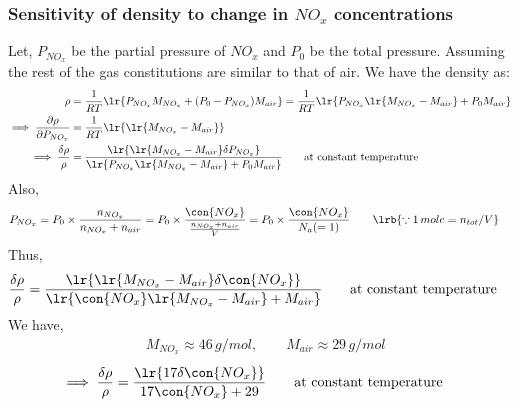 \subsubsection{Sensitivity of density to change in $NO_x$ concentrations}
Let, $P_{NO_x}$ be the partial pressure of $NO_x$ and $P_0$ be the total pressure. Assuming the rest of the gas constitutions are similar to that of air. We have the density as:
\begin{align*}
    \rho &= \frac{1}{RT} \lr{ P_{NO_x} M_{NO_x} + (P_0 - P_{NO_x}) M_{air}} = \frac{1}{RT} \lr{ P_{NO_x} \lr{M_{NO_x} - M_{air}} + P_0 M_{air}}\\
    \implies \frac{\partial \rho}{\partial P_{NO_x}} &= \frac{1}{RT} \lr{\lr{M_{NO_x} - M_{air}}}\\
    \implies \frac{\delta \rho}{\rho} &= \frac{\lr{\lr{M_{NO_x} - M_{air}} \delta P_{NO_x}}}{\lr{ P_{NO_x} \lr{M_{NO_x} - M_{air}} + P_0 M_{air}}} \qquad \text{at constant temperature}
\end{align*}
Also,
\begin{align*}
    P_{NO_x} &= P_0 \times \frac{n_{NO_x}}{n_{NO_x} + n_{air}} = P_0 \times \frac{\con{NO_x}}{\frac{n_{NO_x} + n_{air}}{V}} = P_0 \times \frac{\con{NO_x}}{N_a (=1)} \qquad \lrb{\because 1 \, mole = n_{tot}/V}
\end{align*}
Thus,
\begin{align*}
    \frac{\delta \rho}{\rho} &= \frac{\lr{\lr{M_{NO_x} - M_{air}} \delta \con{NO_x}}}{\lr{ \con{NO_x}
 \lr{M_{NO_x} - M_{air}} + M_{air}}}
    \qquad \text{at constant temperature}
\end{align*}
We have,
\begin{align*}
    &M_{NO_x} \approx 46 \, g/mol, \qquad M_{air} \approx 29 \, g/mol
\end{align*}
\begin{align*}
    \implies \frac{\delta \rho}{\rho} &= \frac{\lr{ 17 \delta \con{NO_x}}}{17 \con{NO_x} + 29}
    \qquad \text{at constant temperature}
\end{align*}
